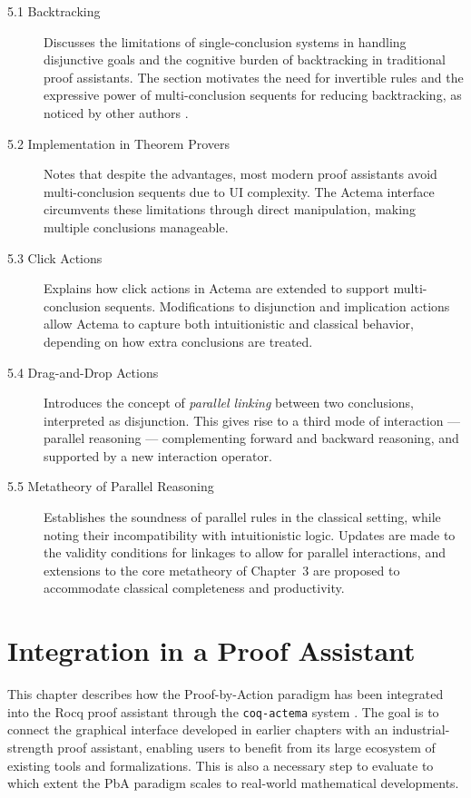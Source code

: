 \documentclass[11pt]{article}
\begin{document}
\begin{description}

  \item[5.1 Backtracking]
  Discusses the limitations of single-conclusion systems in handling disjunctive goals and the cognitive burden of backtracking in traditional proof assistants. The section motivates the need for invertible rules and the expressive power of multi-conclusion sequents for reducing backtracking, as noticed by other authors \cite{ayers_thesis}.

  \item[5.2 Implementation in Theorem Provers]
  Notes that despite the advantages, most modern proof assistants avoid multi-conclusion sequents due to UI complexity. The Actema interface circumvents these limitations through direct manipulation, making multiple conclusions manageable.

  \item[5.3 Click Actions]
  Explains how click actions in Actema are extended to support multi-conclusion sequents. Modifications to disjunction and implication actions allow Actema to capture both intuitionistic and classical behavior, depending on how extra conclusions are treated.

  \item[5.4 Drag-and-Drop Actions]
  Introduces the concept of \emph{parallel linking} between two conclusions, interpreted as disjunction. This gives rise to a third mode of interaction --- parallel reasoning --- complementing forward and backward reasoning, and supported by a new interaction operator.

  \item[5.5 Metatheory of Parallel Reasoning]
  Establishes the soundness of parallel rules in the classical setting, while noting their incompatibility with intuitionistic logic. Updates are made to the validity conditions for linkages to allow for parallel interactions, and extensions to the core metatheory of Chapter~3 are proposed to accommodate classical completeness and productivity.

\end{description}

\section{Integration in a Proof Assistant}

This chapter describes how the Proof-by-Action paradigm has been integrated into the Rocq proof assistant through the \texttt{coq-actema} system \cite{coq-actema}. The goal is to connect the graphical interface developed in earlier chapters with an industrial-strength proof assistant, enabling users to benefit from its large ecosystem of existing tools and formalizations. This is also a necessary step to evaluate to which extent the PbA paradigm scales to real-world mathematical developments.
\end{document}
